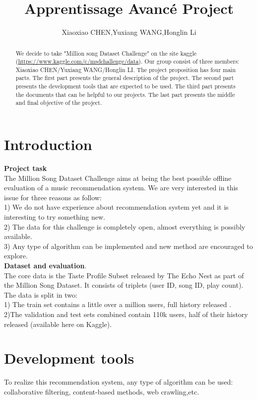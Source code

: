 \documentclass[a4paper]{article}
\title{Apprentissage Avancé Project}
\author{Xiaoxiao CHEN,Yuxiang WANG,Honglin Li}
\begin{document}
\maketitle

\begin{abstract}
We decide to take "Million song Dataset Challenge" on the site kaggle (\url{https://www.kaggle.com/c/msdchallenge/data}). Our group consist of three members: Xiaoxiao CHEN/Yuxiang WANG/Honglin LI. The project proposition has four main parts. The first part presents the general description of the project. The second part presents the development tools that are expected to be used. The third part presents the documents that can be helpful to our projects. The last part presents the middle and final objective of the project.
\end{abstract}

\section{Introduction}
\textbf{Project task}\\
The Million Song Dataset Challenge aims at being the best possible offline evaluation of a music recommendation system. We are very interested in this issue for three reasons as follow:\\
1) We do not have experience about recommendation system yet and it is interesting to try something new.\\
2) The data for this challenge is completely open, almost everything is  possibly available.\\
3) Any type of algorithm can be implemented and new method are encouraged to explore.\\ 
\textbf{Dataset and evaluation}.\\
The core data is the Taste Profile Subset released by The Echo Nest as part of the Million Song Dataset. It consists of triplets (user ID, song ID, play count). The data is split in two:\\
1) The train set contains a little over a million users, full history released .\\
2)The validation and test sets combined contain 110k users, half of their history released (available here on Kaggle). 

\section{Development tools}
To realize this recommendation system, any type of algorithm can be used: collaborative filtering, content-based methods, web crawling,etc.
\end{document}
